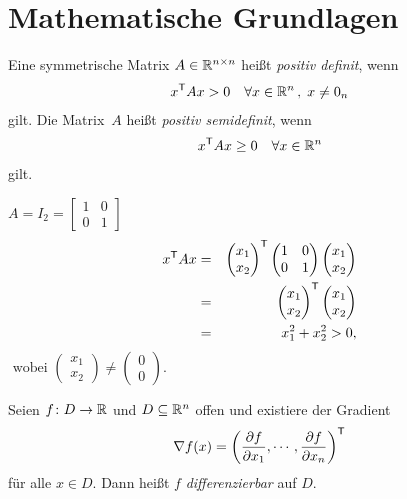 \chapter{Mathematische Grundlagen}

\begin{Definition}
  Eine symmetrische Matrix $A \in \mathbb R^{n \times n}$ hei\ss t \emph{positiv definit}, wenn
  \begin{gather*}
    x^\mathsf{T} A x > 0 \quad \forall x \in \mathbb R^n\,,\; x \neq 0_n
  \end{gather*}
  gilt. Die Matrix~$A$ hei\ss t \emph{positiv semidefinit}, wenn
  \begin{gather*}
    x^\mathsf{T} A x \geq 0 \quad \forall x \in \mathbb R^n
  \end{gather*}
  gilt.
\end{Definition}
\begin{Beispiel}
 $ A=I_2 = \begin{bmatrix}
		1 & 0\\ 0 & 1
 \end{bmatrix}
 $
 \begin{eqnarray*}
	x^\mathsf{T} A x & = &\begin{pmatrix}x_1\\x_2
	\end{pmatrix}^\mathsf{T}\begin{pmatrix}1 & 0\\ 0 & 1\end{pmatrix}\begin{pmatrix}x_1 \\ x_2\end{pmatrix}\\ & = &\begin{pmatrix}x_1 \\ x_2\end{pmatrix}^\mathsf{T} \begin{pmatrix}x_1 \\ x_2\end{pmatrix}\\ & = & x_1^2+x_2^2 > 0 ,
\end{eqnarray*}
$ \text{ wobei } \begin{pmatrix}x_1\\x_2\end{pmatrix} \neq \begin{pmatrix}0\\0\end{pmatrix}$.
\end{Beispiel}
%
\begin{Definition}[Differenzierbarkeit]
\label{def:diffbarkeit}
  Seien $f\colon D\to\mathbb R$ und $D\subseteq\mathbb R^n$ offen und existiere der Gradient
  \begin{equation*}
    \nabla f(x) = \left( \frac{\partial f}{\partial x_1}, \cdots, \frac{\partial f}{\partial x_n} \right)^\mathsf{T}
  \end{equation*}
  \noindent
  f\"ur alle $x \in D$.
  Dann hei\ss t $f$ \emph{differenzierbar} auf $D$.
\end{Definition}

